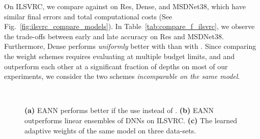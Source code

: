 On ILSVRC, we compare \adaloss against \const on Res, Dense, and MSDNet38, which have similar final errors and total computational costs (See Fig.~\ref{fig:ilsvrc_compare_models}). In Table~\ref{tab:compare_f_ilsvrc}, we observe the trade-offs between early and late accuracy on Res and MSDNet38. Furthermore, Dense performs \emph{uniformly} better with \adaloss than with \const. 
Since comparing the weight schemes requires evaluating \anns at multiple budget limits, and \adaloss and \const outperform each other at a significant fraction of depths on most of our experiments, we consider the two schemes \emph{incomparable on the same model}. 

\begin{figure*}[t]
    \centering
    ~
    ~
    \caption{ \textbf{(a)} EANN performs better if the \anns use \adaloss instead of \const. 
    \textbf{(b)} EANN outperforms linear ensembles of DNNs on ILSVRC.
    \textbf{(c)} The learned adaptive weights of the same model on three data-sets.
    }
\end{figure*}


